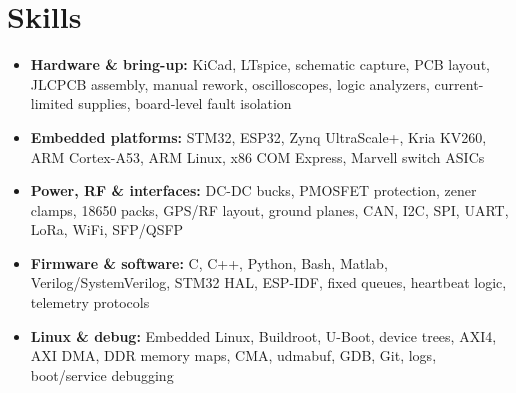 \documentclass[letterpaper,10pt]{article}
\begin{document}
    \section{Skills}
    \begin{itemize}[label={}, leftmargin=0pt, noitemsep]
        \item \textbf{Hardware \& bring-up:} KiCad, LTspice, schematic capture, PCB layout, JLCPCB assembly, manual rework, oscilloscopes, logic analyzers, current-limited supplies, board-level fault isolation
        \item \textbf{Embedded platforms:} STM32, ESP32, Zynq UltraScale+, Kria KV260, ARM Cortex-A53, ARM Linux, x86 COM Express, Marvell switch ASICs
        \item \textbf{Power, RF \& interfaces:} DC-DC bucks, PMOSFET protection, zener clamps, 18650 packs, GPS/RF layout, ground planes, CAN, I2C, SPI, UART, LoRa, WiFi, SFP/QSFP
        \item \textbf{Firmware \& software:} C, C++, Python, Bash, Matlab, Verilog/SystemVerilog, STM32 HAL, ESP-IDF, fixed queues, heartbeat logic, telemetry protocols
        \item \textbf{Linux \& debug:} Embedded Linux, Buildroot, U-Boot, device trees, AXI4, AXI DMA, DDR memory maps, CMA, udmabuf, GDB, Git, logs, boot/service debugging
    \end{itemize}
\end{document}
